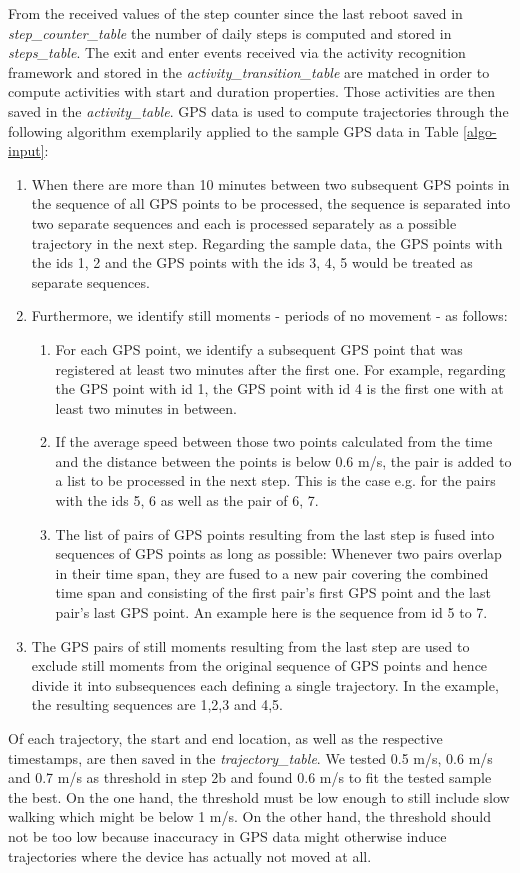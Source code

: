 From the received values of the step counter since the last reboot saved in \textit{step\_counter\_table} the number of daily steps is computed and stored in \textit{steps\_table}. The exit and enter events received via the activity recognition framework and stored in the \textit{activity\_transition\_table} are matched in order to compute activities with start and duration properties. Those activities are then saved in the \textit{activity\_table}.
GPS data is used to compute trajectories through the following algorithm exemplarily applied to the sample GPS data in Table \ref{algo-input}:
\begin{enumerate}
	\item When there are more than 10 minutes between two subsequent GPS points in the sequence of all GPS points to be processed, the sequence is separated into two separate sequences and each is processed separately as a possible trajectory in the next step. Regarding the sample data, the GPS points with the ids 1, 2 and the GPS points with the ids 3, 4, 5 would be treated as separate sequences.
	\item Furthermore, we identify still moments - periods of no movement - as follows:
	\begin{enumerate}
		\item For each GPS point, we identify a subsequent GPS point that was registered at least two minutes after the first one. For example, regarding the GPS point with id 1, the GPS point with id 4 is the first one with at least two minutes in between.
		\item If the average speed between those two points calculated from the time and the distance between the points is below 0.6 m/s, the pair is added to a list to be processed in the next step. This is the case e.g. for the pairs with the ids 5, 6 as well as the pair of 6, 7.
		\item The list of pairs of GPS points resulting from the last step is fused into sequences of GPS points as long as possible: Whenever two pairs overlap in their time span, they are fused to a new pair covering the combined time span and consisting of the first pair's first GPS point and the last pair's last GPS point. An example here is the sequence from id 5 to 7.
	\end{enumerate}
	\item The GPS pairs of still moments resulting from the last step are used to exclude still moments from the original sequence of GPS points and hence divide it into subsequences each defining a single trajectory. In the example, the resulting sequences are 1,2,3 and 4,5.
\end{enumerate}
Of each trajectory, the start and end location, as well as the respective timestamps, are then saved in the \textit{trajectory\_table}. We tested 0.5 m/s, 0.6 m/s and 0.7 m/s as threshold in step 2b and found 0.6 m/s to fit the tested sample the best. On the one hand, the threshold must be low enough to still include slow walking which might be below 1 m/s. On the other hand, the threshold should not be too low because inaccuracy in GPS data might otherwise induce trajectories where the device has actually not moved at all.

